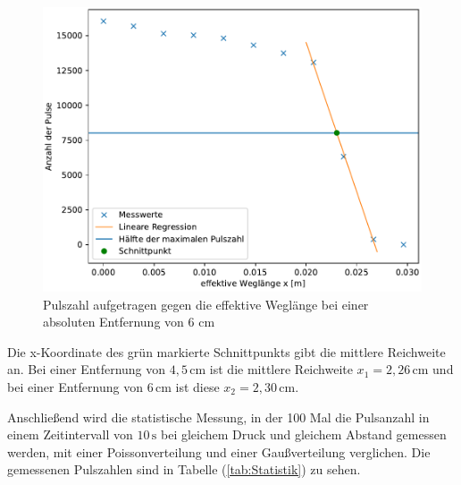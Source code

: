\begin{figure}[H]
    \centering
    \includegraphics[width=\textwidth]{Plots/plot4.pdf}
    \caption{Pulszahl aufgetragen gegen die effektive Weglänge bei einer absoluten Entfernung von 6 cm}
    \label{fig:Weglaenge_2}
\end{figure}
Die x-Koordinate des grün markierte Schnittpunkts gibt die mittlere Reichweite an. Bei einer Entfernung von $4,5 \, \unit{\centi\meter}$ ist die mittlere Reichweite 
$x_1 = 2,26 \, \unit{\centi\meter}$ und bei einer Entfernung von $6 \, \unit{\centi\meter}$ ist diese $x_2 = 2,30 \, \unit{\centi\meter}$. 

Anschließend wird die statistische Messung, in der 100 Mal die Pulsanzahl in einem Zeitintervall von $10 \, \unit{\second}$ bei gleichem Druck und gleichem Abstand gemessen werden, mit einer Poissonverteilung und 
einer Gaußverteilung verglichen. Die gemessenen Pulszahlen sind in Tabelle (\ref{tab:Statistik}) zu sehen. 


